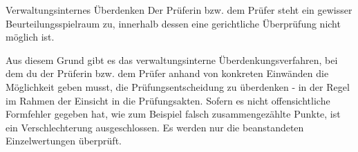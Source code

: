 \begin{artikel}{Verwaltungsinternes Überdenken}
Der Prüferin bzw. dem Prüfer steht ein gewisser Beurteilungsspielraum zu, innerhalb dessen eine gerichtliche Überprüfung nicht möglich ist.

Aus diesem Grund gibt es das verwaltungsinterne Überdenkungsverfahren, bei dem du der Prüferin bzw. dem Prüfer anhand von konkreten Einwänden die Möglichkeit geben musst, die Prüfungsentscheidung zu überdenken - in der Regel im Rahmen der Einsicht in die Prüfungsakten. Sofern es nicht offensichtliche Formfehler gegeben hat, wie zum Beispiel falsch zusammengezählte Punkte, ist ein Verschlechterung ausgeschlossen. Es werden nur die beanstandeten Einzelwertungen überprüft.
\end{artikel}
